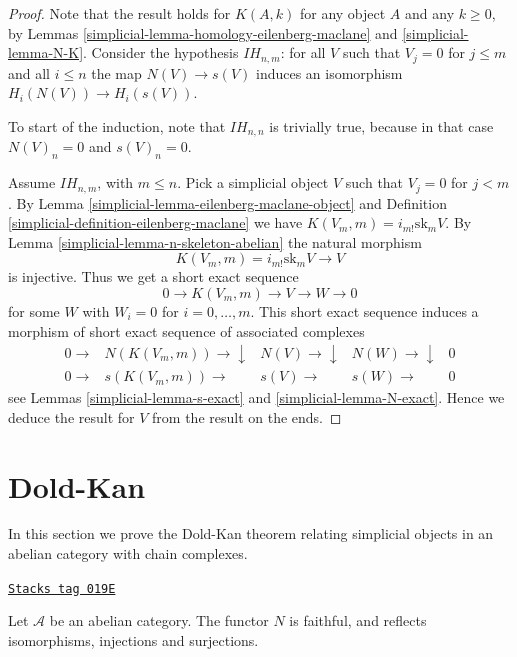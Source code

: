 \begin{proof}

Note that the result holds for $K(A, k)$ for
any object $A$ and any $k \geq 0$, by Lemmas
\ref{simplicial-lemma-homology-eilenberg-maclane} and \ref{simplicial-lemma-N-K}.
Consider the hypothesis $IH_{n, m}$:
for all $V$ such that $V_j = 0$ for
$j \leq m$ and all $i \leq n$ the map
$N(V) \to s(V)$ induces an isomorphism
$H_i(N(V)) \to H_i(s(V))$.

\medskip\noindent
To start of the induction, note that $IH_{n, n}$
is trivially true, because in that case $N(V)_n = 0$
and $s(V)_n = 0$.

\medskip\noindent
Assume $IH_{n, m}$, with $m \leq n$.
Pick a simplicial object $V$ such that
$V_j = 0$ for $j < m$. By Lemma \ref{simplicial-lemma-eilenberg-maclane-object}
and Definition \ref{simplicial-definition-eilenberg-maclane}
we have $K(V_m, m) = i_{m!} \text{sk}_mV$.
By Lemma \ref{simplicial-lemma-n-skeleton-abelian} the natural morphism
$$
K(V_m, m) = i_{m!} \text{sk}_mV \to V
$$
is injective. Thus we get a short exact sequence
$$
0 \to K(V_m, m) \to V \to W \to 0
$$
for some $W$ with $W_i = 0$ for $i = 0, \ldots, m$. This short exact sequence
induces a morphism of short exact sequence of associated complexes
$$
\begin{array}{ccccc}0 \longrightarrow & N(K(V_m, m)) \longrightarrow\downarrow & N(V) \longrightarrow\downarrow & N(W) \longrightarrow\downarrow & 0 \\ 0 \longrightarrow & s(K(V_m, m)) \longrightarrow & s(V) \longrightarrow & s(W) \longrightarrow & 0\end{array}
$$
see Lemmas \ref{simplicial-lemma-s-exact} and \ref{simplicial-lemma-N-exact}.
Hence we deduce the result for $V$ from the result
on the ends.
\end{proof}

\section{Dold-Kan}
\label{simplicial-section-dold-kan}
In this section we prove the Dold-Kan theorem relating
simplicial objects in an abelian category with chain complexes.

\begin{lemma}[N faithful]
\label{simplicial-lemma-N-faithful}
\href{https://stacks.math.columbia.edu/tag/019E}{\texttt{Stacks tag 019E}}

Let $\mathcal{A}$ be an abelian category.
The functor $N$ is faithful, and reflects
isomorphisms, injections and surjections.
\end{lemma}

